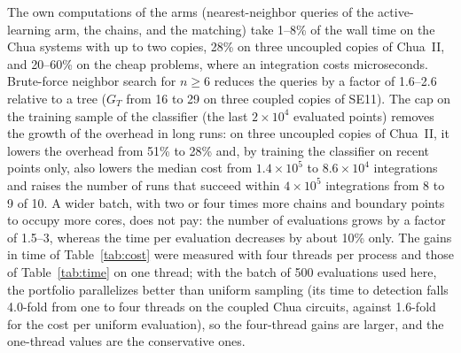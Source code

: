 The own computations of the arms (nearest-neighbor queries of the active-learning arm, the chains, and the matching) take 1--8\% of the wall time on the Chua systems with up to two copies, 28\% on three uncoupled copies of Chua~II, and 20--60\% on the cheap problems, where an integration costs microseconds. Brute-force neighbor search for $n\ge6$ reduces the queries by a factor of 1.6--2.6 relative to a tree ($G_T$ from 16 to 29 on three coupled copies of SE11). The cap on the training sample of the classifier (the last $2\times10^4$ evaluated points) removes the growth of the overhead in long runs: on three uncoupled copies of Chua~II, it lowers the overhead from 51\% to 28\% and, by training the classifier on recent points only, also lowers the median cost from $1.4\times10^5$ to $8.6\times10^4$ integrations and raises the number of runs that succeed within $4\times10^5$ integrations from 8 to 9 of 10. A wider batch, with two or four times more chains and boundary points to occupy more cores, does not pay: the number of evaluations grows by a factor of 1.5--3, whereas the time per evaluation decreases by about 10\% only. The gains in time of Table~\ref{tab:cost} were measured with four threads per process and those of Table~\ref{tab:time} on one thread; with the batch of 500 evaluations used here, the portfolio parallelizes better than uniform sampling (its time to detection falls 4.0-fold from one to four threads on the coupled Chua circuits, against 1.6-fold for the cost per uniform evaluation), so the four-thread gains are larger, and the one-thread values are the conservative ones.
